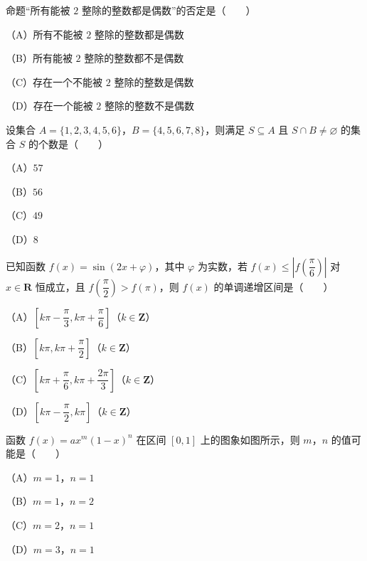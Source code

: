 \begin{question}
命题“所有能被 $2$ 整除的整数都是偶数”的否定是\mbox{（　　）}

（A）所有不能被 $2$ 整除的整数都是偶数

（B）所有能被 $2$ 整除的整数都不是偶数

（C）存在一个不能被 $2$ 整除的整数是偶数

（D）存在一个能被 $2$ 整除的整数不是偶数

\end{question}
\begin{question}
设集合 $A=\{1,2,3,4,5,6\}$，$B=\{4,5,6,7,8\}$，则满足 $S\subseteq A$ 且 $S\cap B\neq\varnothing$ 的集合 $S$ 的个数是\mbox{（　　）}

（A）$57$

（B）$56$

（C）$49$

（D）$8$

\end{question}
\begin{question}
已知函数 $f(x)=\sin(2x+\varphi)$，其中 $\varphi$ 为实数，若 $f(x)\leqslant\left|f\left(\dfrac{\pi}{6}\right)\right|$ 对 $x\in\mathbf R$ 恒成立，且 $f\left(\dfrac{\pi}{2}\right)>f(\pi)$，则 $f(x)$ 的单调递增区间是\mbox{（　　）}

（A）$\left[k\pi-\dfrac{\pi}{3},k\pi+\dfrac{\pi}{6}\right]$（$k\in\mathbf Z$）

（B）$\left[k\pi,k\pi+\dfrac{\pi}{2}\right]$（$k\in\mathbf Z$）

（C）$\left[k\pi+\dfrac{\pi}{6},k\pi+\dfrac{2\pi}{3}\right]$（$k\in\mathbf Z$）

（D）$\left[k\pi-\dfrac{\pi}{2},k\pi\right]$（$k\in\mathbf Z$）

\Needspace{0.4\textheight}
\end{question}
\begin{question}
函数 $f(x)=ax^m(1-x)^n$ 在区间 $[0,1]$ 上的图象如图所示，则 $m$，$n$ 的值可能是\mbox{（　　）}

（A）$m=1$，$n=1$

（B）$m=1$，$n=2$

（C）$m=2$，$n=1$

（D）$m=3$，$n=1$
\nopagebreak[4]
\begin{center}\end{center}
\nopagebreak[4]
\end{question}

